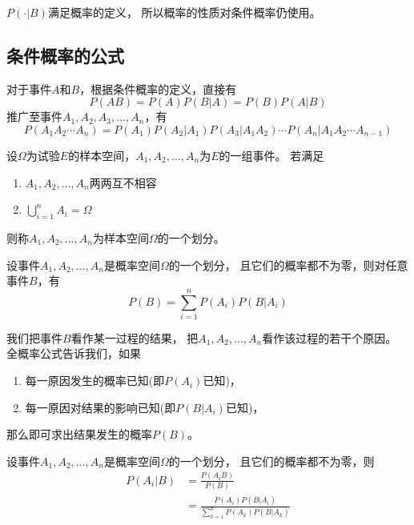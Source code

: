 \begin{remark}
  $P(\cdot|B)$满足概率的定义，
  所以概率的性质对条件概率仍使用。
\end{remark}

\subsection{条件概率的公式}
\begin{theorem}[乘法公式]
  对于事件$A$和$B$，根据条件概率的定义，直接有
  \begin{displaymath}
    P(AB) = P(A)P(B|A) = P(B)P(A|B)
  \end{displaymath}
  推广至事件$A_1,A_2,A_3,\dots,A_n$，有
  \begin{displaymath}
    P(A_1A_2\cdots A_n) = P(A_1)P(A_2|A_1)P(A_3|A_1A_2)
    \cdots P(A_n|A_1A_2\cdots A_{n-1})
  \end{displaymath}
\end{theorem}

\begin{definition}[样本空间的划分]
  设$\Omega$为试验$E$的样本空间，$A_1,A_2,\dots,A_n$为$E$的一组事件。
  若满足
  \begin{enumerate}
    \item 
    $A_1,A_2,\dots,A_n$两两互不相容
    \item 
    $\bigcup_{i=1}^n A_i = \Omega$
  \end{enumerate}
  则称$A_1,A_2,\dots,A_n$为样本空间$\Omega$的一个划分。
\end{definition}

\begin{theorem}[全概率公式]
  设事件$A_1,A_2,\dots,A_n$是概率空间$\Omega$的一个划分，
  且它们的概率都不为零，则对任意事件$B$，有
  \begin{displaymath}
    P(B) = \sum_{i=1}^nP(A_i)P(B|A_i)
  \end{displaymath}
\end{theorem}

\begin{remark}
  我们把事件$B$看作某一过程的结果，
  把$A_1,A_2,\dots,A_n$看作该过程的若干个原因。
  全概率公式告诉我们，如果
  \begin{enumerate}
    \item
    每一原因发生的概率已知(即$P(A_i)$已知)， 
    \item
    每一原因对结果的影响已知(即$P(B|A_i)$已知)， 
  \end{enumerate}
  那么即可求出结果发生的概率$P(B)$。
\end{remark}
\begin{theorem}[贝叶斯公式]
  设事件$A_1,A_2,\dots,A_n$是概率空间$\Omega$的一个划分，
  且它们的概率都不为零，则
  \begin{align*}
    P(A_i|B) &= \frac{P(A_iB)}{P(B)} \\
    &= \frac{P(A_i)P(B|A_i)}{\sum_{k=1}^n P(A_k)P(B|A_k)}
  \end{align*}
\end{theorem}

